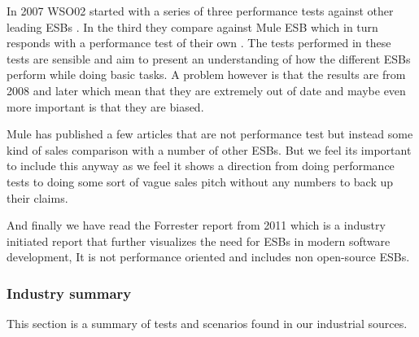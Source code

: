 In 2007 WSO02 started with a series of three performance tests against other leading ESBs \cite{Perera07,Perera07R2,Perera07R3}. In the third they compare against Mule ESB which in turn responds with a performance test of their own \cite{mulesoft08}. The tests performed in these tests are sensible and aim to present an understanding of how the different ESBs perform while doing basic tasks. A problem however is that the results are from 2008 and later which mean that they are extremely out of date and maybe even more important is that they are biased.


Mule has published a few articles that are not performance test but instead some kind of sales comparison with a number of other ESBs\cite{mulevsjboss,mulevsglassfish,mulevsservicemix}.
But we feel its important to include this anyway as we feel it shows a direction from doing performance tests to doing some sort of vague sales pitch without any numbers to back up their claims.

And finally we have read the Forrester report \cite{forrester11} from 2011 which is a industry initiated report that further visualizes the need for ESBs in modern software development, It is not performance oriented and includes non open-source ESBs.

\subsubsection{Industry summary}
This section is a summary of tests and scenarios found in our industrial sources.


